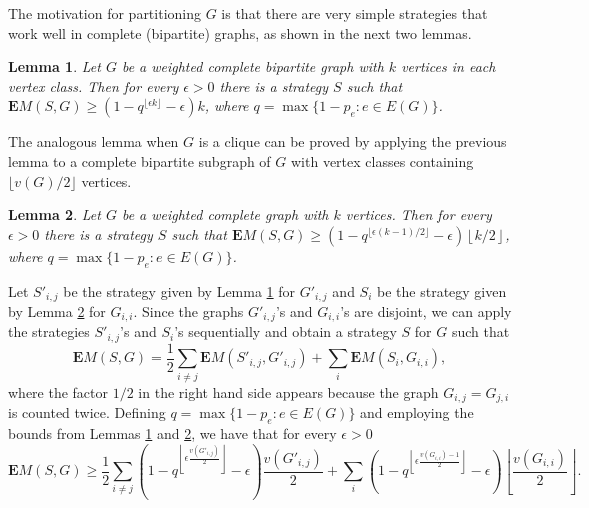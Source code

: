 \documentclass[12pt]{article}
\newtheorem{lemma}{Lemma}
\newcommand{\EMf}[2]{\mathbf{E}M(#1,#2)}
\begin{document}
		The motivation for partitioning $G$ is that there are very simple strategies that work well in complete (bipartite) graphs, as shown in the next two lemmas. 
		
		\begin{lemma} \label{Sbipartite}
			Let $G$ be a weighted complete bipartite graph with $k$ vertices in each vertex class. Then for every $\epsilon > 0$ there is a strategy $S$ such that $\EMf{S}{G} \ge (1 - q^{\lfloor \epsilon k \rfloor} - \epsilon) k$, where $q = \max\{1 - p_e : e \in E(G)\}$. 
		\end{lemma}		
	
	The analogous lemma when $G$ is a clique can be proved by applying the previous lemma to a complete bipartite subgraph of $G$ with vertex classes containing $\lfloor v(G)/2 \rfloor$ vertices. 
	
		\begin{lemma} \label{Scomplete}
			Let $G$ be a weighted complete graph with $k$ vertices. Then for every $\epsilon > 0$ there is a strategy $S$ such that $\EMf{S}{G} \ge (1 - q^{\lfloor \epsilon (k - 1)/2 \rfloor} - \epsilon) \left\lfloor k/2\right\rfloor$, where $q = \max\{1 - p_e : e \in E(G)\}$.  
		\end{lemma}

		Let $S'_{i,j}$ be the strategy given by Lemma \ref{Sbipartite} for $G'_{i,j}$ and $S_i$ be the strategy given by Lemma \ref{Scomplete} for $G_{i,i}$. Since the graphs $G'_{i,j}$'s and $G_{i,i}$'s are disjoint, we can apply the strategies $S'_{i,j}$'s and $S_i$'s sequentially and obtain a strategy $S$ for $G$ such that $$\EMf{S}{G} = \frac{1}{2} \sum_{i \neq j} \EMf{S'_{i,j}}{G'_{i,j}} + \sum_i \EMf{S_i}{G_{i,i}},$$ where the factor $1/2$ in the right hand side appears because the graph $G_{i,j} = G_{j,i}$ is counted twice. Defining $q = \max \{1 - p_e : e \in E(G)\}$ and employing the bounds from Lemmas \ref{Sbipartite} and \ref{Scomplete}, we have that for every $\epsilon > 0$
\begin{equation*}
			\EMf{S}{G} \ge \frac{1}{2} \sum_{i\neq j} \left(1 - q^{ \left\lfloor \epsilon \frac{v(G'_{i,j})}{2} \right\rfloor} - \epsilon \right) \frac{v(G'_{i,j})}{2} + \sum_i \left(1 - q^{\left\lfloor \epsilon \frac{v(G_{i,i}) - 1}{2} \right\rfloor} - \epsilon \right) \left \lfloor \frac{v(G_{i,i})}{2} \right \rfloor.
		\end{equation*}
	
\end{document}
